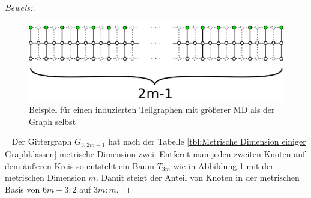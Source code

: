 \begin{proof}[Beweis:]$\;$
\begin{figure}[h!]
		\centering 		 
\includegraphics[width=420pt]{bilder/gitterzubaumlsch.pdf}
   \caption{Beispiel für einen induzierten Teilgraphen mit größerer MD als der Graph selbst}
   \label{bild:Gitterbaum2}
  	 \end{figure}
~ \linebreak
Der Gittergraph $G_{3,2m-1}$ hat nach der Tabelle \ref{tbl:Metrische Dimension einiger Graphklassen} metrische Dimension zwei. Entfernt man jeden zweiten Knoten auf dem äußeren Kreis so entsteht ein Baum $T_{3m}$ wie in Abbildung \ref{bild:Gitterbaum2} mit der metrischen Dimension $m$. Damit steigt der Anteil von Knoten in der metrischen Basis von $6m-3:2$ auf $3m:m$.
\end{proof}


